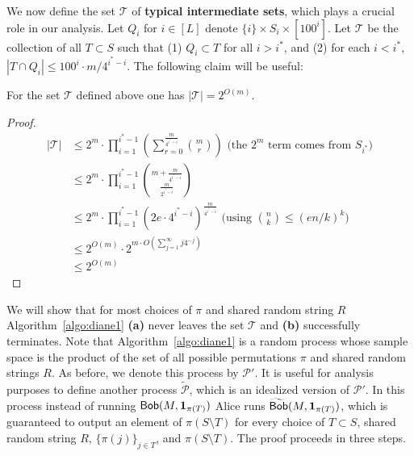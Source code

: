 We now define the set $\mathcal{T}$ of {\bf typical intermediate sets}, which plays a crucial role in our analysis.  Let $Q_i$ for $i\in [L]$ denote $\{i\} \times S_i \times [100^i]$. Let $\mathcal{T}$ be the collection of all $T\subset S$ such that (1) $Q_i\subset T$ for all $i>i^*$, and (2) for each $i < i^*$, $|T\cap Q_i| \le 100^i\cdot  m/4^{i^*-i}$.  The following claim will be useful:
\begin{claim}\label{cl:size-of-t}
For the set $\mathcal{T}$ defined above one has $|\mathcal{T}|=2^{O(m)}$.
\end{claim}
\begin{proof}
\begin{align*}
|\mathcal T| &\le 2^m \cdot \prod_{i=1}^{i^*-1}\left(\sum_{r=0}^{\frac m{4^{i^*-i}}} \binom mr\right)\text{ (the }2^m\text{ term comes from }S_{i^*}\text{)}\\
{}&\le 2^m \cdot \prod_{i=1}^{i^*-1} \binom{m + \frac m{4^{i^* - i}}}{\frac m{2^{i^* - i}}}\\
{}&\le 2^m \cdot \prod_{i=1}^{i^*-1} (2e\cdot 4^{i^*-i})^{\frac m{4^{i^* - i}}}\text{ (using }\binom nk \le (en/k)^k\textrm{)}\\
{}&\le 2^{O(m)} \cdot 2^{m\cdot O(\sum_{j=1}^\infty j 4^{-j})} \\
{}& \le 2^{O(m)}
\end{align*}
\end{proof}


We will show that for most choices of $\pi$ and shared random string $R$ Algorithm~\ref{algo:diane1} {\bf (a)} never leaves the set $\mathcal{T}$ and {\bf (b)} successfully terminates.  Note that Algorithm~\ref{algo:diane1} is a random process whose sample space is the product of the set of all possible permutations $\pi$ and shared random strings $R$. As before, we denote this process by $\mathcal{P}'$. It is useful for analysis purposes to define another process $\widetilde{\mathcal{P}}$, which is an idealized version of $\mathcal{P}'$. In this process instead of running  $\mathsf{Bob}(M, \mathbf{1}_{\pi(T)})$ Alice runs  $\widetilde{\mathsf{Bob}}(M, \mathbf{1}_{\pi(T)})$, which is guaranteed to output an element of $\pi(S\setminus T)$ for every choice of  $T\subset S$, shared random string $R$, $\{\pi(j)\}_{j\in T}$, and $\pi(S\setminus T)$. The proof proceeds in three steps.



